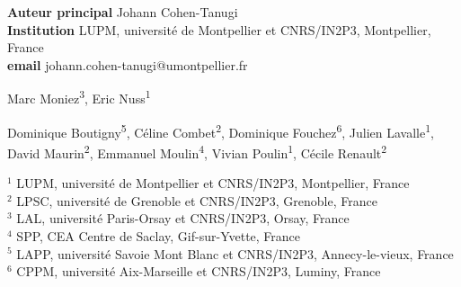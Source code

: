
\def\altaffilmark#1{\textsuperscript{#1}}
\def\affil#1{\noindent #1 \\}

%

\begin{flushleft}
  {\bf Auteur principal}  Johann Cohen-Tanugi\\
  {\bf Institution}  LUPM, université de Montpellier et CNRS/IN2P3, Montpellier, France\\
  {\bf email} johann.cohen-tanugi@umontpellier.fr
\end{flushleft}       


\begin{raggedright}
\small
Marc Moniez\altaffilmark{3}, Eric Nuss\altaffilmark{1}
\end{raggedright}

\begin{raggedright}
\small
Dominique Boutigny\altaffilmark{5},
Céline Combet\altaffilmark{2},
Dominique Fouchez\altaffilmark{6},
Julien Lavalle\altaffilmark{1},
David Maurin\altaffilmark{2},
Emmanuel Moulin\altaffilmark{4},
Vivian Poulin\altaffilmark{1},
Cécile Renault\altaffilmark{2}
\end{raggedright}

\scriptsize

\affil{$^{1}$ LUPM, université de Montpellier et CNRS/IN2P3, Montpellier, France}
\affil{$^{2}$ LPSC, université de Grenoble et CNRS/IN2P3, Grenoble, France}
\affil{$^{3}$ LAL, université Paris-Orsay et CNRS/IN2P3, Orsay, France}
\affil{$^{4}$ SPP, CEA Centre de Saclay, Gif-sur-Yvette, France}
\affil{$^{5}$ LAPP, université Savoie Mont Blanc et CNRS/IN2P3, Annecy-le-vieux, France}
\affil{$^{6}$ CPPM, université Aix-Marseille et CNRS/IN2P3, Luminy, France}
\normalsize
